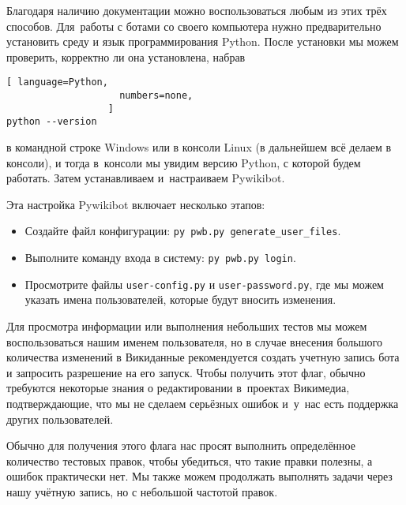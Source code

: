 Благодаря наличию документации можно воспользоваться любым из этих трёх способов. 
Для~работы с ботами со своего компьютера нужно предварительно установить среду и язык программирования Python. 
После установки мы можем проверить, 
корректно ли она установлена, набрав

\begin{lstlisting}[ language=Python,
                    numbers=none,
                  ]
python --version
\end{lstlisting}
в командной строке Windows или в консоли Linux (в дальнейшем всё делаем в консоли), 
и тогда в~консоли мы увидим версию Python, с которой будем работать. 
Затем устанавливаем и~настраиваем Pywikibot. 



\newpage
Эта настройка Pywikibot включает несколько этапов:
\begin{itemize}
  \item Создайте файл конфигурации: \lstinline|py pwb.py generate_user_files|.
  \item Выполните команду входа в систему: \lstinline|py pwb.py login|.
  \item Просмотрите файлы \lstinline|user-config.py| и \lstinline|user-password.py|, где мы можем указать имена пользователей, которые будут вносить изменения.
\end{itemize}

Для просмотра информации или выполнения небольших тестов 
мы можем воспользоваться нашим именем пользователя, 
%
но в случае внесения большого количества изменений в Викиданные 
рекомендуется создать учетную запись бота и запросить разрешение на его запуск. 
Чтобы получить этот флаг, обычно требуются некоторые знания о редактировании в~проектах Викимедиа, 
подтверждающие, что мы не сделаем серьёзных ошибок и~у~нас есть поддержка других пользователей.

Обычно для получения этого флага нас просят выполнить определённое количество тестовых правок, 
чтобы убедиться, что такие правки полезны, а ошибок практически нет. 
Мы также можем продолжать выполнять задачи через нашу учётную запись, но с небольшой частотой правок.


